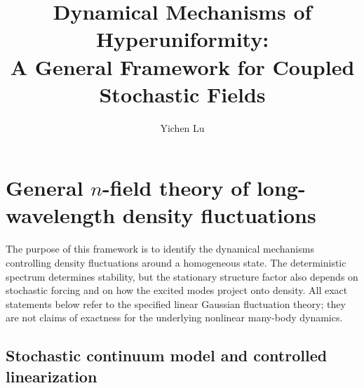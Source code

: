 \documentclass{article}
\title{\textbf{Dynamical Mechanisms of Hyperuniformity: \\ A General Framework for Coupled Stochastic Fields}}
\author{Yichen Lu}
\begin{document}
\maketitle

\tableofcontents

\section{General \texorpdfstring{$n$}{n}-field theory of long-wavelength density fluctuations}
\label{sec:generalFramework}

The purpose of this framework is to identify the dynamical mechanisms controlling density fluctuations around a homogeneous state. The deterministic spectrum determines stability, but the stationary structure factor also depends on stochastic forcing and on how the excited modes project onto density. All exact statements below refer to the specified linear Gaussian fluctuation theory; they are not claims of exactness for the underlying nonlinear many-body dynamics.

\subsection{Stochastic continuum model and controlled linearization}
\end{document}
